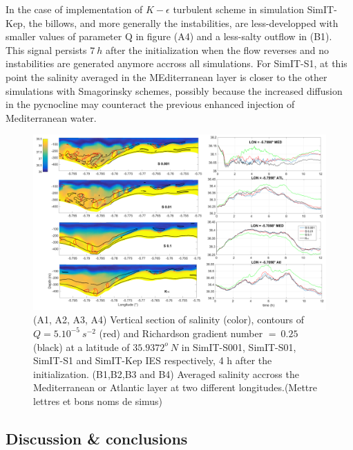 In the case of implementation of $K-\epsilon$ turbulent scheme in simulation SimIT-Kep, the billows, and more generally the instabilities, are less-developped with smaller values of parameter Q in figure (A4) and a less-salty outflow in (B1). This signal persists $7\ h$ after the initialization when the flow reverses and no instabilities are generated anymore accross all simulations. For SimIT-S1, at this point the salinity averaged in the MEditerranean layer is closer to the other simulations with Smagorinsky schemes, possibly because the increased diffusion in the pycnocline may counteract the previous enhanced injection of Mediterranean water.

\begin{figure}[!h]
 \includegraphics[width=\textwidth]{./GBR3D/Figsmago.png}
 \caption { (A1, A2, A3, A4) Vertical section of salinity (color), contours of $Q = 5.10^{-5} \ s^{-2}$ (red) and Richardson gradient number $=\ 0.25$ (black) at a latitude of $35.9372^o\ N$ in SimIT-S001, SimIT-S01, SimIT-S1 and SimIT-Kep IES respectively, 4 h after the initialization. (B1,B2,B3 and B4) Averaged salinity accross the Mediterranean or Atlantic layer at two different longitudes.\color{red}(Mettre lettres et bons noms de simus)\color{black}}
 \label{Fig3Dsch}
\end{figure}

\subsection{Discussion \& conclusions}
